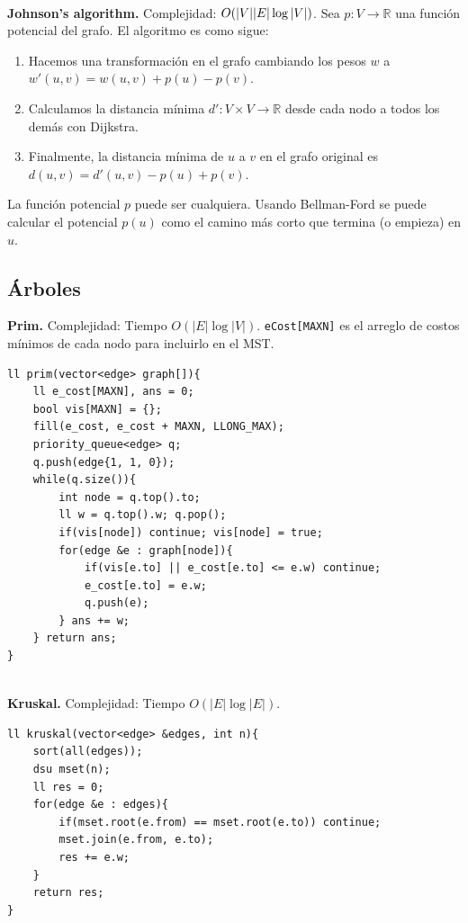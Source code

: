 \documentclass[10pt,spanish,mexico]{article}
\numberwithin{equation}{section}
\newcommand{\R}{\mathbb{R}}
\newcommand{\pa}[1]{\left( #1 \right)}
\begin{document}
\begin{multicols}{2}
\vspace{-1.2\baselineskip}
\hrulefill\\
\textbf{Johnson's algorithm.} Complejidad: $O(\abs{V}\abs{E}\log\abs{V})$. Sea $p: V \to \R$ una función potencial del grafo. El algoritmo es como sigue:
\begin{enumerate}[1.]
    \item Hacemos una transformación en el grafo cambiando los pesos $w$ a $w'(u, v) = w(u, v) + p(u) - p(v)$.
    \item Calculamos la distancia mínima $d': V \times V \to \R$ desde cada nodo a todos los demás con Dijkstra.
    \item Finalmente, la distancia mínima de $u$ a $v$ en el grafo original es $d(u, v) = d'(u, v) - p(u) + p(v)$.
\end{enumerate}
La función potencial $p$ puede ser cualquiera. Usando Bellman-Ford se puede calcular el potencial $p(u)$ como el camino más corto que termina (o empieza) en $u$.

\hrulefill
\subsection{Árboles}
\textbf{Prim.} Complejidad: Tiempo $O(|E| \log |V|)$. \texttt{eCost[MAXN]} es el arreglo de costos mínimos de cada nodo para incluirlo en el MST.
\begin{verbatim}
ll prim(vector<edge> graph[]){
    ll e_cost[MAXN], ans = 0;
    bool vis[MAXN] = {};
    fill(e_cost, e_cost + MAXN, LLONG_MAX);
    priority_queue<edge> q;
    q.push(edge{1, 1, 0});
    while(q.size()){
        int node = q.top().to;
        ll w = q.top().w; q.pop();
        if(vis[node]) continue; vis[node] = true;
        for(edge &e : graph[node]){
            if(vis[e.to] || e_cost[e.to] <= e.w) continue;
            e_cost[e.to] = e.w;
            q.push(e);
        } ans += w;
    } return ans;
}
\end{verbatim}

\vspace{-1.2\baselineskip}
\hrulefill\\
\textbf{Kruskal.} Complejidad: Tiempo $O\pa{|E|\log |E|}$.
\begin{verbatim}
ll kruskal(vector<edge> &edges, int n){
    sort(all(edges));
    dsu mset(n);
    ll res = 0;
    for(edge &e : edges){
        if(mset.root(e.from) == mset.root(e.to)) continue;
        mset.join(e.from, e.to);
        res += e.w;
    }
    return res;
}
\end{verbatim}


\end{multicols}
\end{document}
